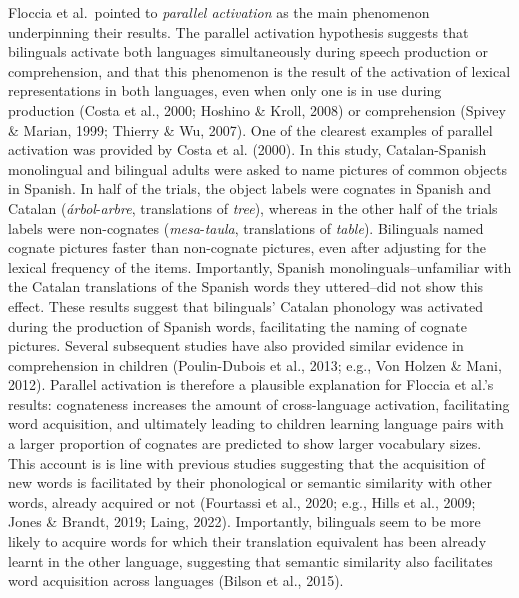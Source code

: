 \documentclass[
  letterpaper,
  DIV=11,
  numbers=noendperiod]{scrartcl}
\begin{document}
Floccia et al.~pointed to \emph{parallel activation} as the main
phenomenon underpinning their results. The parallel activation
hypothesis suggests that bilinguals activate both languages
simultaneously during speech production or comprehension, and that this
phenomenon is the result of the activation of lexical representations in
both languages, even when only one is in use during production (Costa et
al., 2000; Hoshino \& Kroll, 2008) or comprehension (Spivey \& Marian,
1999; Thierry \& Wu, 2007). One of the clearest examples of parallel
activation was provided by Costa et al. (2000). In this study,
Catalan-Spanish monolingual and bilingual adults were asked to name
pictures of common objects in Spanish. In half of the trials, the object
labels were cognates in Spanish and Catalan (\emph{árbol}-\emph{arbre},
translations of \emph{tree}), whereas in the other half of the trials
labels were non-cognates (\emph{mesa}-\emph{taula}, translations of
\emph{table}). Bilinguals named cognate pictures faster than non-cognate
pictures, even after adjusting for the lexical frequency of the items.
Importantly, Spanish monolinguals--unfamiliar with the Catalan
translations of the Spanish words they uttered--did not show this
effect. These results suggest that bilinguals' Catalan phonology was
activated during the production of Spanish words, facilitating the
naming of cognate pictures. Several subsequent studies have also
provided similar evidence in comprehension in children (Poulin-Dubois et
al., 2013; e.g., Von Holzen \& Mani, 2012). Parallel activation is
therefore a plausible explanation for Floccia et al.'s results:
cognateness increases the amount of cross-language activation,
facilitating word acquisition, and ultimately leading to children
learning language pairs with a larger proportion of cognates are
predicted to show larger vocabulary sizes. This account is is line with
previous studies suggesting that the acquisition of new words is
facilitated by their phonological or semantic similarity with other
words, already acquired or not (Fourtassi et al., 2020; e.g., Hills et
al., 2009; Jones \& Brandt, 2019; Laing, 2022). Importantly, bilinguals
seem to be more likely to acquire words for which their translation
equivalent has been already learnt in the other language, suggesting
that semantic similarity also facilitates word acquisition across
languages (Bilson et al., 2015).
\end{document}
